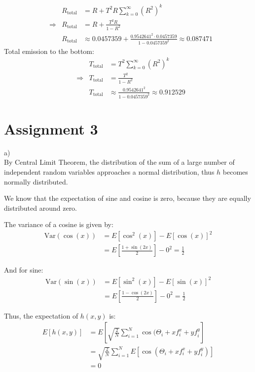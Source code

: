 \documentclass{article}
\begin{document}
    \begin{align*}
        &&               R_{\text{total}} &= R + T^2 R \sum_{k=0}^{\infty} (R^2)^k\\
        &\Rightarrow&    R_{\text{total}} &= R + \frac{T^2 R}{1 - R^2}\\
        &&               R_{\text{total}} &\approx 0.0457359 + \frac{0.9542641^2 \cdot 0.0457359}{1 - 0.0457359^2} \approx 0.087471
    \end{align*}
    Total emission to the bottom:\\
    \begin{align*}
        &&               T_{\text{total}} &= T^2 \sum_{k=0}^{\infty} (R^2)^k\\
        &\Rightarrow&    T_{\text{total}} &= \frac{T^2}{1 - R^2}\\
        &&               T_{\text{total}} &\approx \frac{0.9542641^2}{1 - 0.0457359^2} \approx 0.912529
    \end{align*}
    
    \section*{Assignment 3}

    a)\\
    By Central Limit Theorem, the distribution of the sum of a large number of independent random variables approaches a normal distribution, thus $h$ becomes normally distributed.

    We know that the expectation of sine and cosine is zero, because they are equally distributed around zero.
    
    The variance of a cosine is given by:
    \begin{align*}
        \text{Var}(\cos(x)) &= E[\cos^2(x)] - E[\cos(x)]^2\\
        &= E[\frac{1 + \sin(2x)}{2}] - 0^2 = \frac{1}{2}
    \end{align*}

    And for sine:
    \begin{align*}
        \text{Var}(\sin(x)) &= E[\sin^2(x)] - E[\sin(x)]^2\\
        &= E[\frac{1 - \cos(2x)}{2}] - 0^2 = \frac{1}{2}
    \end{align*}

    Thus, the expectation of $h(x,y)$ is:
    \begin{align*}
        E[h(x,y)] &= E[\sqrt{\frac{2}{N}} \sum_{i=1}^{N} \cos(\Theta_i + x f_i^x + y f_i^y]\\
        &= \sqrt{\frac{2}{N}} \sum_{i=1}^{N} E[\cos(\Theta_i + x f_i^x + y f_i^y)]\\
        &= 0
    \end{align*}
\end{document}
